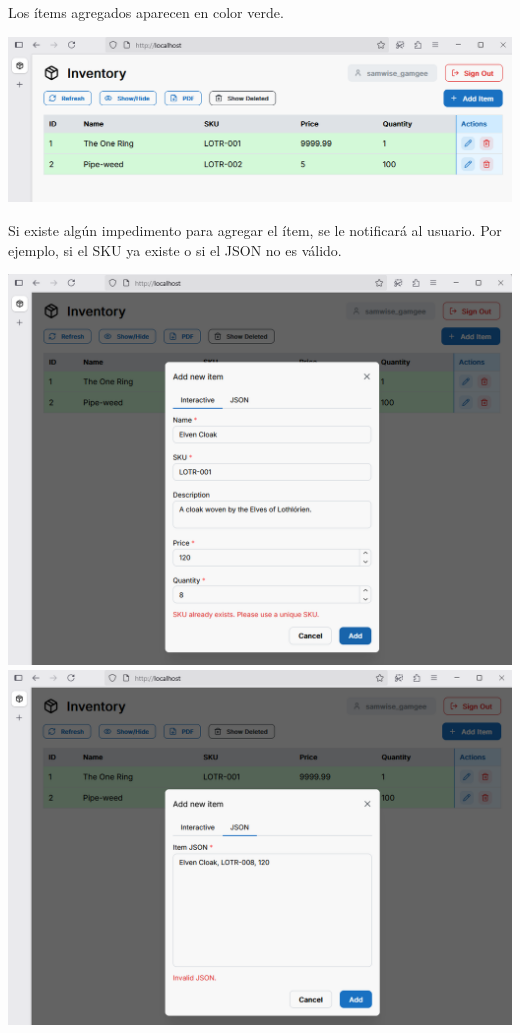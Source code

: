 Los ítems agregados aparecen en color verde.

\includegraphics[width=\textwidth]{images/8 Agregado}

Si existe algún impedimento para agregar el ítem, se le notificará al usuario. Por ejemplo, si el SKU ya existe o si el JSON no es válido.

\includegraphics[width=\textwidth]{images/9 Agregar Error}
\includegraphics[width=\textwidth]{images/10 Agregar Error JSOn}

